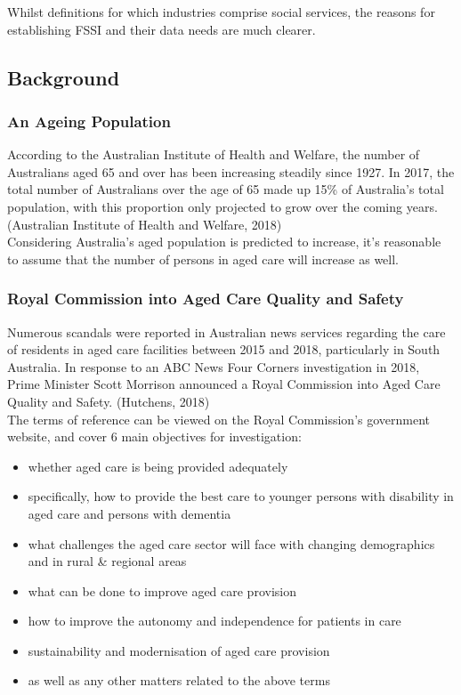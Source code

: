 \documentclass[
  11pt,
]{article}
\providecommand{\tightlist}{%
  \setlength{\itemsep}{0pt}\setlength{\parskip}{0pt}}
\begin{document}
Whilst definitions for which industries comprise social services, the reasons for establishing FSSI and their data needs are much clearer.

\hypertarget{background}{%
\subsection{Background}\label{background}}

\hypertarget{an-ageing-population}{%
\subsubsection{An Ageing Population}\label{an-ageing-population}}

According to the Australian Institute of Health and Welfare, the number of Australians aged 65 and over has been increasing steadily since 1927. In 2017, the total number of Australians over the age of 65 made up 15\% of Australia's total population, with this proportion only projected to grow over the coming years. (Australian Institute of Health and Welfare, 2018)\\
Considering Australia's aged population is predicted to increase, it's reasonable to assume that the number of persons in aged care will increase as well.

\newpage

\hypertarget{royal-commission-into-aged-care-quality-and-safety}{%
\subsubsection{Royal Commission into Aged Care Quality and Safety}\label{royal-commission-into-aged-care-quality-and-safety}}

Numerous scandals were reported in Australian news services regarding the care of residents in aged care facilities between 2015 and 2018, particularly in South Australia. In response to an ABC News Four Corners investigation in 2018, Prime Minister Scott Morrison announced a Royal Commission into Aged Care Quality and Safety. (Hutchens, 2018)\\
The terms of reference can be viewed on the Royal Commission's government website, and cover 6 main objectives for investigation:

\begin{itemize}
\tightlist
\item
  whether aged care is being provided adequately
\item
  specifically, how to provide the best care to younger persons with disability in aged care and persons with dementia
\item
  what challenges the aged care sector will face with changing demographics and in rural \& regional areas
\item
  what can be done to improve aged care provision
\item
  how to improve the autonomy and independence for patients in care
\item
  sustainability and modernisation of aged care provision
\item
  as well as any other matters related to the above terms
\end{itemize}
\end{document}
